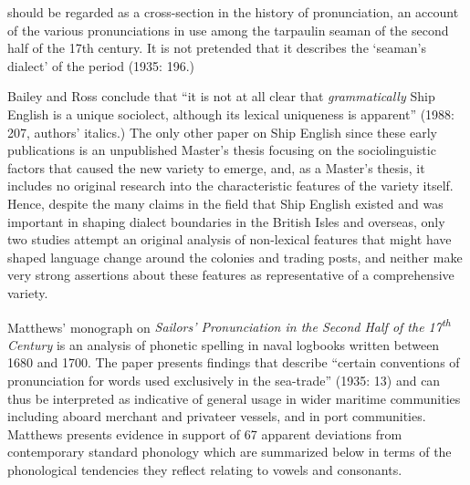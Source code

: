 should be regarded as a cross-section in the history of pronunciation, an account of the various pronunciations in use among the tarpaulin seaman of the second half of the 17th century. It is not pretended that it describes the ‘seaman’s dialect’ of the period (1935: 196.)

Bailey and Ross conclude that “it is not at all clear that \textit{grammatically} Ship English is a unique sociolect, although its lexical uniqueness is apparent” (1988: 207, authors’ italics.) The only other paper on Ship English since these early publications is an unpublished Master’s thesis \citep{Schultz2010} focusing on the sociolinguistic factors that caused the new variety to emerge, and, as a Master’s thesis, it includes no original research into the characteristic features of the variety itself. Hence, despite the many claims in the field that Ship English existed and was important in shaping dialect boundaries in the British Isles and overseas, only two studies attempt an original analysis of non-lexical features that might have shaped language change around the colonies and trading posts, and neither make very strong assertions about these features as representative of a comprehensive variety.  

Matthews’ monograph on \textit{Sailors’ Pronunciation in the Second Half of the 17\textsuperscript{th}} \textit{Century} is an analysis of phonetic spelling in naval logbooks written between 1680 and 1700. The paper presents findings that describe “certain conventions of pronunciation for words used exclusively in the sea-trade” (1935: 13) and can thus be interpreted as indicative of general usage in wider maritime communities including aboard merchant and privateer vessels, and in port communities. Matthews presents evidence in support of 67 apparent deviations from contemporary standard phonology which are summarized below in terms of the phonological tendencies they reflect relating to vowels and consonants. 

